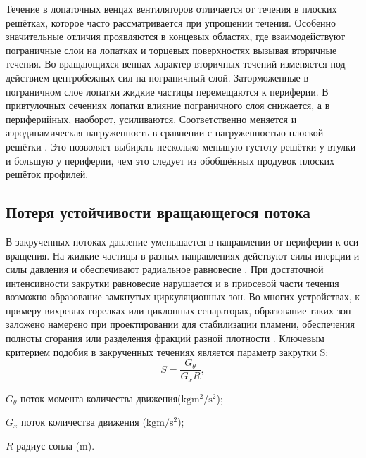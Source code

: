 Течение в лопаточных венцах вентиляторов отличается от течения в плоских решётках, которое часто рассматривается при упрощении течения. Особенно значительные отличия проявляются в концевых областях, где взаимодействуют пограничные слои на лопатках и торцевых поверхностях вызывая вторичные течения. 
Во вращающихся венцах характер вторичных течений изменяется под действием центробежных сил на пограничный слой. Заторможенные в пограничном слое лопатки жидкие частицы перемещаются к периферии. В привтулочных сечениях лопатки влияние пограничного слоя снижается, а в периферийных, наоборот, усиливаются. Соответственно меняется и аэродинамическая нагруженность в сравнении с нагруженностью плоской решётки \cite{Brusilovskiy1986}. Это позволяет выбирать несколько меньшую густоту решётки у втулки и большую у периферии, чем это следует из обобщённых продувок плоских решёток профилей.

\subsection{Потеря устойчивости вращающегося потока}\label{ch1/sec6}

В закрученных потоках давление уменьшается в направлении от периферии к оси вращения. На жидкие частицы в разных направлениях действуют силы инерции и силы давления и обеспечивают радиальное равновесие \cite{Smith1966}. При достаточной интенсивности закрутки равновесие нарушается и в приосевой части течения возможно образование замкнутых циркуляционных зон. Во многих устройствах, к примеру вихревых горелках или циклонных сепараторах, образование таких зон заложено намерено при проектировании для стабилизации пламени, обеспечения полноты сгорания или разделения фракций разной плотности \cite{Gupta1987, Goldschtik1981}.
Ключевым критерием подобия в закрученных течениях является параметр закрутки S:
\begin{equation}
	S = \frac{G_\theta}{G_x R},
	\label{eq:S}
\end{equation}
\begin{eqexpl}
	\item{\(G_\theta\)} поток момента количества движения(\(\si\kilogram \si\meter^2/\si\second^2\));
	\item{\(G_x\)} поток количества движения (\(\si\kilogram \si\meter/\si\second^2\));
	\item{\(R\)} радиус сопла (\(\si\meter\)).
\end{eqexpl}

